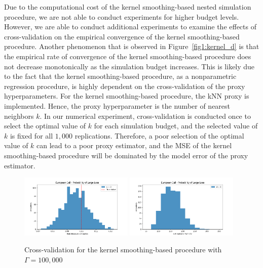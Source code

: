 Due to the computational cost of the kernel smoothing-based nested simulation procedure, we are not able to conduct experiments for higher budget levels.
However, we are able to conduct additional experiments to examine the effects of cross-validation on the empirical convergence of the kernel smoothing-based procedure.
Another phenomenon that is observed in Figure~\ref{fig1:kernel_d} is that the empirical rate of convergence of the kernel smoothing-based procedure does not decrease monotonically as the simulation budget increases.
This is likely due to the fact that the kernel smoothing-based procedure, as a nonparametric regression procedure, is highly dependent on the cross-validation of the proxy hyperparameters.
For the kernel smoothing-based procedure, the kNN proxy is implemented. 
Hence, the proxy hyperparameter is the number of nearest neighbors $k$.
In our numerical experiment, cross-validation is conducted once to select the optimal value of $k$ for each simulation budget, and the selected value of $k$ is fixed for all $1,000$ replications.
Therefore, a poor selection of the optimal value of $k$ can lead to a poor proxy estimator, and the MSE of the kernel smoothing-based procedure will be dominated by the model error of the proxy estimator.

\begin{figure}[ht!]
    \centering
    \includegraphics[width=0.48\textwidth]{./project1/figures/figure5a.png}
    \includegraphics[width=0.48\textwidth]{./project1/figures/figure5b.png}
    \caption{Cross-validation for the kernel smoothing-based procedure with $\Gamma=100,000$}
    \label{fig1:kernel_cv} 
\end{figure}

